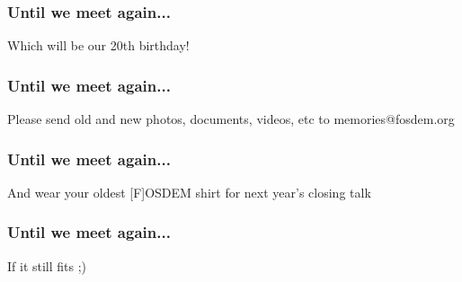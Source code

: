 \documentclass[aspectratio=169]{beamer}
\begin{document}
\begin{frame}
	\frametitle{Until we meet again...}
	\vfill
	\begin{center}
		{\Huge Which will be our 20th birthday!}
	\end{center}
	\vfill
\end{frame}

\begin{frame}
	\frametitle{Until we meet again...}
	\vfill
	\begin{center}
		{\Huge Please send old and new photos, documents, videos, etc to memories@fosdem.org}
	\end{center}
	\vfill
\end{frame}

\begin{frame}
	\frametitle{Until we meet again...}
	\vfill
	\begin{center}
		{\Huge And wear your oldest [F]OSDEM shirt for next year's closing talk}
	\end{center}
	\vfill
\end{frame}

\begin{frame}
	\frametitle{Until we meet again...}
	\vfill
	\begin{center}
		{\Huge If it still fits ;)}
	\end{center}
	\vfill
\end{frame}
\end{document}
